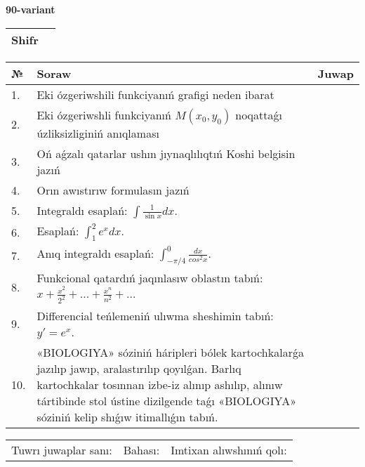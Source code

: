 \documentclass{article}
\begin{document}
  \egroup
  
  \newpage
  
  
  \textbf{90-variant}\\
  
  \bgroup
  \def\arraystretch{1.6} %
  
  \begin{tabular}{|m{5.7cm}|m{9.5cm}|}
  \hline
  Shifr & \\
  \hline
  \end{tabular}
  
  \vspace{1cm}
  
  \begin{tabular}{|m{0.7cm}|m{10cm}|m{4cm}|}
  \hline
  № & Soraw & Juwap \\
  \hline
  1. & Eki ózgeriwshili funkciyanıń grafigi neden ibarat &  \\
  \hline
  2. & Eki ózgeriwshli funkciyanıń \(M(x_{0}, y_{0})\) noqattaǵı úzliksizliginiń anıqlaması &  \\
  \hline
  3. & Oń aǵzalı qatarlar ushın jıynaqlılıqtıń Koshi belgisin jazıń &  \\
  \hline
  4. & Orın awıstırıw formulasın jazıń &  \\
  \hline
  5. & Integraldı esaplań: \(\int{\frac{1}{\sin x}dx}\). &  \\
  \hline
  6. & Esaplań: \(\int_{1}^2 {e^{x}dx}\). &  \\
  \hline
  7. & Anıq integraldı esaplań: \(\int_{- \pi/4}^{0}\frac{dx}{cos^2 x}\). &  \\
  \hline
  8. & Funkcional qatardıń jaqınlasıw oblastın tabıń: \(x + \frac{x^2 }{2^2 } + ... + \frac{x^{n}}{n^2 } + ...\) &  \\
  \hline
  9. & Differencial teńlemeniń ulıwma sheshimin tabıń: \(y' = e^{x}\). &  \\
  \hline
  10. & «BIOLOGIYA» sóziniń háripleri bólek kartochkalarǵa jazılıp jawıp, aralastırılıp qoyılǵan. Barlıq kartochkalar tosınnan izbe-iz alınıp ashılıp, alınıw tártibinde stol ústine dizilgende taǵı «BIOLOGIYA» sóziniń kelip shıǵıw itimallıǵın tabıń. &  \\
  \hline
  \end{tabular}
  
  \vspace{1cm}
  
  \begin{tabular}{lll}
  Tuwrı juwaplar sanı: \underline{\hspace{1.5cm}} & 
  Bahası: \underline{\hspace{1.5cm}} & 
  Imtixan alıwshınıń qolı: \underline{\hspace{2cm}} \\
  \end{tabular}
  
\end{document}
